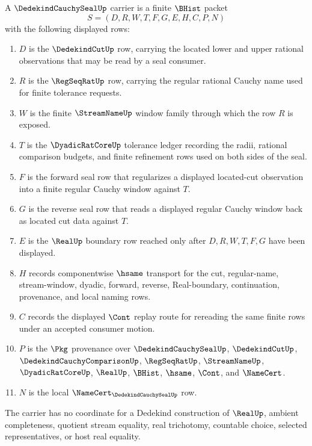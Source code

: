 \begin{definition}
\label{def:dedekind-cauchy-seal-carrier}
A $\DedekindCauchySealUp$ carrier is a finite $\BHist$ packet
$$
S=(D,R,W,T,F,G,E,H,C,P,N)
$$
with the following displayed rows:
\begin{enumerate}
\item $D$ is the $\DedekindCutUp$ row, carrying the located lower and upper rational observations that may be read by a seal consumer.
\item $R$ is the $\RegSeqRatUp$ row, carrying the regular rational Cauchy name used for finite tolerance requests.
\item $W$ is the finite $\StreamNameUp$ window family through which the row $R$ is exposed.
\item $T$ is the $\DyadicRatCoreUp$ tolerance ledger recording the radii, rational comparison budgets, and finite refinement rows used on both sides of the seal.
\item $F$ is the forward seal row that regularizes a displayed located-cut observation into a finite regular Cauchy window against $T$.
\item $G$ is the reverse seal row that reads a displayed regular Cauchy window back as located cut data against $T$.
\item $E$ is the $\RealUp$ boundary row reached only after $D,R,W,T,F,G$ have been displayed.
\item $H$ records componentwise $\hsame$ transport for the cut, regular-name, stream-window, dyadic, forward, reverse, Real-boundary, continuation, provenance, and local naming rows.
\item $C$ records the displayed $\Cont$ replay route for rereading the same finite rows under an accepted consumer motion.
\item $P$ is the $\Pkg$ provenance over $\DedekindCauchySealUp$, $\DedekindCutUp$, $\DedekindCauchyComparisonUp$, $\RegSeqRatUp$, $\StreamNameUp$, $\DyadicRatCoreUp$, $\RealUp$, $\BHist$, $\hsame$, $\Cont$, and $\NameCert$.
\item $N$ is the local $\NameCert_{\DedekindCauchySealUp}$ row.
\end{enumerate}
The carrier has no coordinate for a Dedekind construction of $\RealUp$, ambient completeness, quotient stream equality, real trichotomy, countable choice, selected representatives, or host real equality.
\end{definition}

